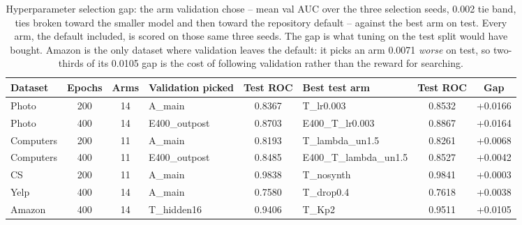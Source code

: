 \begin{table}[t]
\centering
\small
\begin{tabular}{lcclclcc}
\toprule
Dataset & Epochs & Arms & Validation picked & Test ROC & Best test arm & Test ROC & Gap \\
\midrule
Photo & 200 & 14 & A\_main & 0.8367 & T\_lr0.003 & 0.8532 & +0.0166 \\
Photo & 400 & 14 & E400\_outpost & 0.8703 & E400\_T\_lr0.003 & 0.8867 & +0.0164 \\
Computers & 200 & 11 & A\_main & 0.8193 & T\_lambda\_un1.5 & 0.8261 & +0.0068 \\
Computers & 400 & 11 & E400\_outpost & 0.8485 & E400\_T\_lambda\_un1.5 & 0.8527 & +0.0042 \\
CS & 200 & 11 & A\_main & 0.9838 & T\_nosynth & 0.9841 & +0.0003 \\
Yelp & 400 & 14 & A\_main & 0.7580 & T\_drop0.4 & 0.7618 & +0.0038 \\
Amazon & 400 & 14 & T\_hidden16 & 0.9406 & T\_Kp2 & 0.9511 & +0.0105 \\
\bottomrule
\end{tabular}
\caption{Hyperparameter selection gap: the arm validation chose -- mean val AUC over the three selection seeds, 0.002 tie band, ties broken toward the smaller model and then toward the repository default -- against the best arm on test. Every arm, the default included, is scored on those same three seeds. The gap is what tuning on the test split would have bought. Amazon is the only dataset where validation leaves the default: it picks an arm 0.0071 \emph{worse} on test, so two-thirds of its 0.0105 gap is the cost of following validation rather than the reward for searching.}
\label{tab:hparam}
\end{table}
